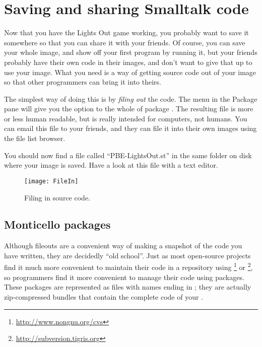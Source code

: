 \documentclass[a4paper,10pt,twoside]{book}
\begin{document}
\section{Saving and sharing Smalltalk code}

Now that you have the Lights Out game working, you probably want to save it somewhere so that you can share it with your friends. Of course, you can save your whole \pharo image, and show off your first program by running it, but your friends probably have their own code in their images, and don't want to give that up to use your image.
What you need is a way of getting source code out of your \pharo image so that other programmers can bring it into theirs.

The simplest way of doing this is by \emph{filing out} the code.  The \actclick menu in the Package pane will give you the option to  the whole of package .
The resulting file is more or less human readable, but is really intended for computers, not humans.
You can email this file to your friends, and they can file it into their own \pharo images using the file list browser.

You should now find a file called ``PBE-LightsOut.st'' in the same folder on disk where your image is saved.
Have a look at this file with a text editor.


\begin{figure}[ht]
\centerline {\texttt{[image: FileIn]}}
\caption{Filing in \pharo source code.
}
\end{figure}

\subsection{Monticello packages}
Although fileouts are a convenient way of making a snapshot of the code you have written, they are decidedly ``old school''.
Just as most open-source projects find it much more convenient to maintain their code in a repository using \footnote{\url{http://www.nongnu.org/cvs}} or \footnote{\url{http://subversion.tigris.org}},
so \pharo programmers find it more convenient to manage their code using  packages. 
These packages are represented as files with names ending in ; they are actually zip-compressed bundles that contain the complete code of your .
\end{document}
